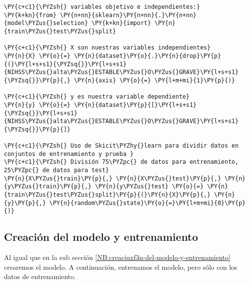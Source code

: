     \begin{tcolorbox}[breakable, size=fbox, boxrule=1pt, pad at break*=1mm,colback=cellbackground, colframe=cellborder]
\begin{Verbatim}[commandchars=\\\{\}]
\PY{c+c1}{\PYZsh{} variables objetivo e independientes:}
\PY{k+kn}{from} \PY{n+nn}{sklearn}\PY{n+nn}{.}\PY{n+nn}{model\PYZus{}selection} \PY{k+kn}{import} \PY{n}{train\PYZus{}test\PYZus{}split}

\PY{c+c1}{\PYZsh{} X son nuestras variables independientes}
\PY{n}{X} \PY{o}{=} \PY{n}{dataset}\PY{o}{.}\PY{n}{drop}\PY{p}{(}\PY{l+s+s1}{\PYZsq{}}\PY{l+s+s1}{NIHSS\PYZus{}alta\PYZus{}ESTABLE\PYZus{}O\PYZus{}GRAVE}\PY{l+s+s1}{\PYZsq{}}\PY{p}{,} \PY{n}{axis} \PY{o}{=} \PY{l+m+mi}{1}\PY{p}{)}

\PY{c+c1}{\PYZsh{} y es nuestra variable dependiente}
\PY{n}{y} \PY{o}{=} \PY{n}{dataset}\PY{p}{[}\PY{l+s+s1}{\PYZsq{}}\PY{l+s+s1}{NIHSS\PYZus{}alta\PYZus{}ESTABLE\PYZus{}O\PYZus{}GRAVE}\PY{l+s+s1}{\PYZsq{}}\PY{p}{]}

\PY{c+c1}{\PYZsh{} Uso de Skicit\PYZhy{}learn para dividir datos en conjuntos de entrenamiento y prueba }
\PY{c+c1}{\PYZsh{} División 75\PYZpc{} de datos para entrenamiento, 25\PYZpc{} de datos para test}
\PY{n}{X\PYZus{}train}\PY{p}{,} \PY{n}{X\PYZus{}test}\PY{p}{,} \PY{n}{y\PYZus{}train}\PY{p}{,} \PY{n}{y\PYZus{}test} \PY{o}{=} \PY{n}{train\PYZus{}test\PYZus{}split}\PY{p}{(}\PY{n}{X}\PY{p}{,} \PY{n}{y}\PY{p}{,} \PY{n}{random\PYZus{}state}\PY{o}{=}\PY{l+m+mi}{0}\PY{p}{)}
\end{Verbatim}
\end{tcolorbox}

    \hypertarget{creaciuxf3n-del-modelo-y-entrenamiento}{%
\subsection{Creación del modelo y entrenamiento}\label{creaciuxf3n-del-modelo-y-entrenamiento}}

	Al igual que en la sub sección \ref{NB:creaciuxf3n-del-modelo-y-entrenamiento} crearemos el modelo.
	A continuación, entrenamos el modelo, pero sólo con los datos de entrenamiento. 

